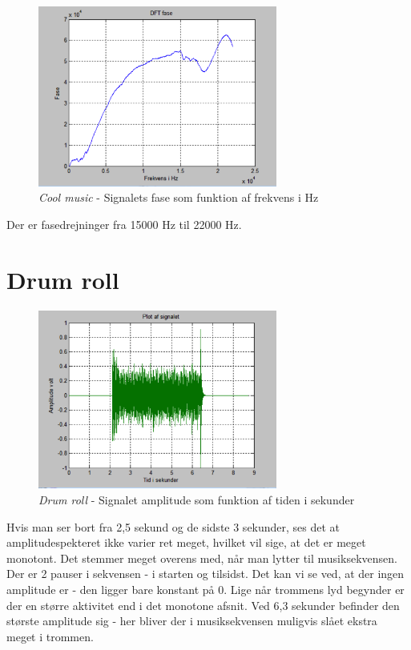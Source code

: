 \begin{figure}[H]
	\centering
	\includegraphics[width=0.7\textwidth]{Figurer/Snip20151001_6}
	\caption{\textit{Cool music} - Signalets fase som funktion af frekvens i Hz}
\end{figure} 

Der er fasedrejninger fra 15000 Hz til 22000 Hz. 

\section{Drum roll}
 
\begin{figure}[H]
	\centering
	\includegraphics[width=0.7\textwidth]{Figurer/Snip20151001_9}
	\caption{\textit{Drum roll} - Signalet amplitude som funktion af tiden i sekunder}
\end{figure}

Hvis man ser bort fra 2,5 sekund og de sidste 3 sekunder, ses det at amplitudespekteret ikke varier ret meget, hvilket vil sige, at det er meget monotont. Det stemmer meget overens med, når man lytter til musiksekvensen. Der er 2 pauser i sekvensen - i starten og tilsidst. Det kan vi se ved, at der ingen amplitude er - den ligger bare konstant på 0. Lige når trommens lyd begynder er der en større aktivitet end i det monotone afsnit. Ved 6,3 sekunder befinder den største amplitude sig - her bliver der i musiksekvensen muligvis slået ekstra meget i trommen.  

